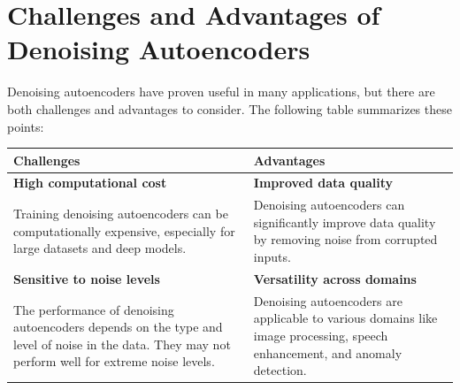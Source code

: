 \documentclass[a4paper,12pt]{article}
\begin{document}
\vspace{0.5 cm}
\section{Challenges and Advantages of Denoising Autoencoders}

Denoising autoencoders have proven useful in many applications, but there are both challenges and advantages to consider. The following table summarizes these points:
\vspace{0.3 cm}

\begin{table}[h!]
    \centering
    \renewcommand{\arraystretch}{1.6} %
    \begin{tabular}{|p{6cm}|p{6cm}|}
    \hline
    \textbf{Challenges} & \textbf{Advantages} \\ \hline
    \textbf{High computational cost} & \textbf{Improved data quality} \\
    Training denoising autoencoders can be computationally expensive, especially for large datasets and deep models. & Denoising autoencoders can significantly improve data quality by removing noise from corrupted inputs. \\ \hline
    
    \textbf{Sensitive to noise levels} & \textbf{Versatility across domains} \\
    The performance of denoising autoencoders depends on the type and level of noise in the data. They may not perform well for extreme noise levels. & Denoising autoencoders are applicable to various domains like image processing, speech enhancement, and anomaly detection. \\ \hline
    \end{tabular}
    \label{tab:challenges_advantages_part1}
    \end{table}
    
    \newpage
    
\end{document}

